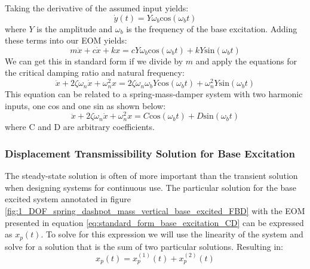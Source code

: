 \documentclass[12pt,letter]{article}
\numberwithin{ex}{section} %
\numberwithin{re}{section} %
\begin{document}
			Taking the derivative of the assumed input yields:
			\begin{equation}
			\dot{y}(t) = Y \omega_b \text{cos}(\omega_b t)
			\end{equation}
			where $Y$ is the amplitude and $\omega_b$ is the frequency of the base excitation. Adding these terms into our EOM yields:
			\begin{equation}
			m\ddot{x} + c\dot{x} + kx = c Y \omega_b \text{cos}(\omega_b t)  + k Y\text{sin}(\omega_b t)  
			\end{equation}
			We can get this in standard form if we divide by $m$ and apply the equations for the critical damping ratio and natural frequency:
			\begin{equation}
			\ddot{x} + 2 \zeta \omega_n \dot{x} + \omega_n^2x = 2 \zeta \omega_n \omega_b Y \text{cos}(\omega_b t)  + \omega_n^2 Y\text{sin}(\omega_b t)
			\label{eq:standard_form_base_excitation}  
			\end{equation}
			This equation can be related to a spring-mass-damper system with two harmonic inputs, one cos and one sin as shown below:
			\begin{equation}
			\ddot{x} + 2 \zeta \omega_n \dot{x} + \omega_n^2x = C \text{cos}(\omega_b t)  + D \text{sin}(\omega_b t)  
			\label{eq:standard_form_base_excitation_CD}
			\end{equation}
			where C and D are arbitrary coefficients. 

	
			\subsubsection{Displacement Transmissibility Solution for Base Excitation}
				The steady-state solution is often of more important than the transient solution when designing systems for continuous use. The particular solution for the base excited system annotated in figure \ref{fig:1_DOF_spring_dashpot_mass_vertical_base_excited_FBD} with the EOM presented in equation \ref{eq:standard_form_base_excitation_CD} can be expressed as $	x_p(t)$. To solve for this expression we will use the linearity of the system and solve for a solution that is the sum of two particular solutions. Resulting in:
				\begin{equation}
				 x_p(t) = 	x_p^{(1)}(t) + 	x_p^{(2)}(t)  
				\end{equation}
				
\end{document}
